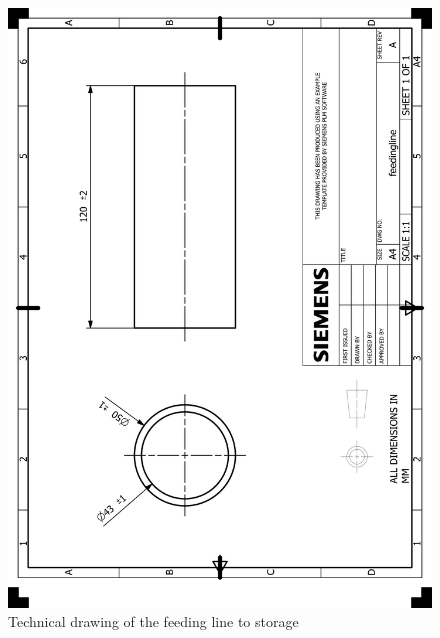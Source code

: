 \documentclass[12pt]{report}
\begin{document}
\begin{appendices}
\begin{figure}[H]
    \centering
    \includegraphics[width=\textwidth]{HP_feedingline.png} 
    \caption{Technical drawing of the feeding line to storage}
    \label{fig:technical-drawing}
\end{figure}


\end{appendices}
\end{document}
